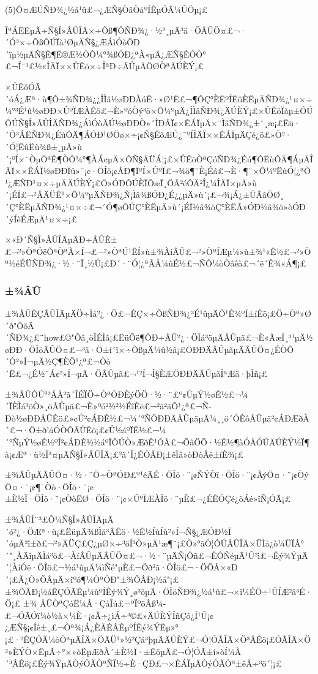 (5)Ô¤ÆÚÑÐ¾¿½á¹û£¬¿ÆÑ§ÒâÒåºÍÊµÓÃ¼ÛÖµ¡£

ÎªÁËËµÃ÷Ñ§Î»ÂÛÎÄ×÷Õß¶ÔÑÐ¾¿·½°¸µÄ³ä·ÖÂÛÖ¤£¬·´Ó³×÷ÕßÔÚÏà¹ØµÄÑ§¿ÆÁìÓòÖÐ´ïµ½µÄÑ§Ê¶Ë®Æ½ÒÔ¼°¾ßÓÐ¿ªÀ«µÄ¿ÆÑ§ÊÓÒ°£¬Í¨³£½«ÎÄÏ××ÛÊö×÷ÎªÐ÷ÂÛµÄÖØÒªÄÚÈÝ¡£

×ÛÊöÓÃ´óÁ¿Æª·ù¶Ô±¾ÑÐ¾¿¿ÎÌâ½øÐÐÀúÊ·»Ø¹Ë£¬¶ÔÇ°ÈËºÍËûÈËµÄÑÐ¾¿¹¤×÷¼°³É¹û½øÐÐ×ÛºÏÆÀÊö£¬È»ºóÒý³ö×Ô¼ºµÄ¿ÎÌâÑÐ¾¿ÄÚÈÝ¡£×ÛÊöÏàµ±ÓÚÔÚÑ§Î»ÂÛÎÄÑÐ¾¿ÁìÓòÄÚ½øÐÐÒ»´ÎÐÅÏ¢×ÊÁÏµÄ×¨ÌâÑÐ¾¿±¨¸æ¡£Ëü·´Ó³ÁËÑÐ¾¿ÉúÔÄ¶ÁÓÐ¹ØÖø×÷¡¢Ñ§ÊõÆÚ¿¯ºÍÎÄÏ××ÊÁÏµÄÇé¿ö£»Ò²·´Ó¦ËûËù¾ß±¸µÄ»ù´¡ºÍ×¨ÒµÖªÊ¶ÒÔ¼°¶ÀÁ¢µÄ×ÔÑ§ÄÜÁ¦¡£×ÛÊöÒªÇóÑÐ¾¿Éú¶ÔËùÔÄ¶ÁµÄÎÄÏ××ÊÁÏ½øÐÐÏû»¯¡¢·ÖÎö¡¢ÅÐ¶ÏºÍ×ÛºÏ£¬¾ö¶¨È¡Éá£¬È·¶¨×Ô¼ºËùÓ¦¿ªÕ¹¿ÆÑÐ¹¤×÷µÄÄÚÈÝ¡£Ö»ÓÐÔÚÈÏÕæÏ¸ÖÂ²éÔÄ²Î¿¼ÎÄÏ×µÄ»ù´¡ÉÏ£¬²ÅÄÜÊ¹×Ô¼ºµÄÑÐ¾¿Ñ¡Ìâ¾ßÓÐ¿É¿¿µÄ»ù´¡£¬¾¡Á¿±ÜÃâÖØ¸´Ç°ÈËµÄÑÐ¾¿¹¤×÷£¬´Ó¶øÔÚÇ°ÈËµÄ»ù´¡ÉÏ½â¾öÇ°ÈËÃ»ÓÐ½â¾ö»òÓÐ´ýÍêÉÆµÄ¹¤×÷¡£

×«Ð´Ñ§Î»ÂÛÎÄµÄÐ÷ÂÛÊ±£¬²»ÒªÓëÕªÒªÀ×Í¬£¬²»ÒªÚ¹ÊÍ»ù±¾ÀíÂÛ£¬²»ÒªÍÆµ¼»ù±¾¹«Ê½£¬²»Òª½éÉÜÑÐ¾¿·½·¨Ï¸½Ú¡£Ð´·¨Ó¦¿ªÃÅ¼ûÉ½£¬ÑÔ¼òÒâêà£¬´ë´Ê¾«Á¶¡£

\subsubsection{±¾ÂÛ}

±¾ÂÛÊÇÂÛÎÄµÄÖ÷Ìå²¿·Ö£¬ÊÇ×÷ÕßÑÐ¾¿³É¹ûµÄÕ¹Ê¾ºÍ±íÊö¡£Ö÷Òª»Ø´ð"ÔõÃ´ÑÐ¾¿£¨how£©"Õâ¸öÎÊÌâ¡£ËüÕë¶ÔÐ÷ÂÛ²¿·ÖÌá³öµÄÂÛµã£¬È«ÃæÍ¸³¹µÄ½øÐÐ·ÖÎöÂÛÖ¤£¬³ä·Ö±í´ï×÷ÕßµÄ¼û½â¡£ÖÐÐÄÂÛµãµÄÂÛÖ¤¿ÉÒÔ´Ó²»Í¬µÄ½Ç¶ÈÕ¹¿ª£¬Òò´Ë£¬¿É½¨Á¢²»Í¬µÄ·ÖÂÛµã£¬¹²Í¬Î§ÈÆÖÐÐÄÂÛµãÎªÆä·þÎñ¡£

±¾ÂÛÔÚ°²ÅÅ²ã´ÎÉÏÖ÷ÒªÓÐÈýÖÖ·½·¨£º¢ÙµÝ½øÊ½£¬¼´ÏÈÌá³öÒ»¸öÂÛµã£¬È»ºó²½²½ÉîÈë£¬²ã²ãÕ¹¿ª£¬Ñ­Ðò½øÐÐÂÛÊö£»¢Ú²¢ÁÐÊ½£¬¼´°ÑÖÐÐÄÂÛµãµÄ¼¸¸ö´ÓÊôÂÛµã²¢ÁÐÆðÀ´£¬·Ö±ð¼ÓÒÔÂÛÊö¡£¢Û½áºÏÊ½£¬¼´°ÑµÝ½øÊ½ºÍ²¢ÁÐÊ½½áºÏÔÚÒ»ÆðÊ¹ÓÃ£¬ÕâÖÖ·½Ê½¶àÓÃÓÚÄÚÈÝ½Ï¶à¡¢Æª·ù½Ï³¤µÄÑ§Î»ÂÛÎÄ¡£²ã´Î¿ÉÓÃÐ¡±êÌâ»òÐòÂë±íÊ¾¡£

±¾ÂÛµÄÂÛÖ¤·½·¨Ö÷ÒªÓÐ£º¹éÄÉ·ÖÎö·¨¡¢ÑÝÒï·ÖÎö·¨¡¢ÀýÖ¤·¨¡¢ÒýÖ¤·¨¡¢¶¯Òò·ÖÎö·¨¡¢±È½Ï·ÖÎö·¨¡¢ÒòËØ·ÖÎö·¨¡¢×ÛºÏÆÀÎö·¨µÈ£¬¿ÉÊÓÇé¿öÁé»îÑ¡ÓÃ¡£

±¾ÂÛÍ¨³£Õ¼Ñ§Î»ÂÛÎÄµÄ´ó²¿·ÖÆª·ù¡£ËüµÄ¾ßÌå³ÂÊö·½Ê½ÍùÍù²»Í¬Ñ§¿ÆÓÐ½Ï´óµÄ²î±ð£¬²»ÄÜÇ£Ç¿µØ×÷³öÍ³Ò»µÄ¹æ¶¨¡£Ò»°ãÓ¦ÔÚÂÛÎÄ×ÜÌå¿ò¼ÜÏÂ°´"¸ÅÄîµÄÌá³ö£¬ÀíÂÛµÄÂÛÖ¤£¬·½·¨µÄÑ¡Ôñ£¬ÊÔÑéµÄ¹Û²ì£¬Êý¾ÝµÄ´¦ÀíÓë·ÖÎö£¬½á¹ûµÄ¼ìÑé"µÈ£¬Öð²ã·ÖÎö£¬·ÖÕÂ×«Ð´¡£Ã¿Ò»ÕÂµÄ×îºó¶¼ÒªÓÐ"±¾ÕÂÐ¡½á"¡£±¾ÕÂÐ¡½áÊÇÓÃÊµ¼ùºÍÊý¾Ý¸ø³öµÄ·ÖÎöÑÐ¾¿½á¹û£¬×î¼ÉÖ÷¹ÛÍÆ²â³É·Ö¡£
±¾
ÂÛÒªÇóË¼Â·ÇåÎú£¬ºÏºõÂß¼­£¬ÓÃÓï¼ò½à×¼È·¡¢Ã÷¿ìÁ÷³©£»ÄÚÈÝÎñÇó¿Í¹Û¡¢¿ÆÑ§¡¢Íê±¸£¬Òª¾¡Á¿ÈÃÊÂÊµºÍÊý¾ÝËµ»°¡£·²ÊÇÓÃ¼òÒªµÄÎÄ×ÖÄÜ¹»½²Çå³þµÄÄÚÈÝ£¬Ó¦ÓÃÎÄ×Ö³ÂÊö¡£ÓÃÎÄ×Ö²»ÈÝÒ×ËµÃ÷°×»òËµÆðÀ´±È½Ï·±ËöµÄ£¬Ó¦ÓÃ±í»òÍ¼À´³ÂÊö¡£Êý¾ÝµÄÒýÓÃÒªÑÏ½÷È·ÇÐ£¬×ÊÁÏµÄÒýÓÃÒª±êÃ÷³ö´¦¡£

